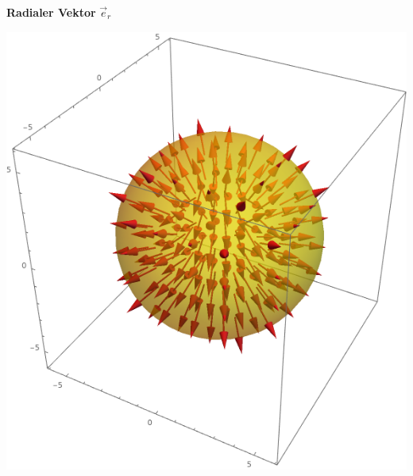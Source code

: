 \fboxsep=0pt
\begin{minipage}[t]{0.48\linewidth}

	\begin{center}

		\textbf{Radialer Vektor} $\vec{e}_r$

	\end{center}

	\begin{center}

		\includegraphics[scale=0.4]{spherical_r.png}

	\end{center}
\end{minipage}
\hfill%
